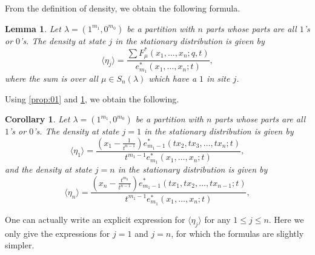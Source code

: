 \documentclass[12pt]{amsart}
\newtheorem{cor}[thm]{Corollary}
\newtheorem{lem}[thm]{Lemma}
\theoremstyle{definition}
\def\LW#1{(\textcolor{teal}{LW:#1})}
\def\HBD#1{(\textcolor{violet}{HBD:#1})}
\begin{document}
From the definition of density, we obtain the following formula. 
\begin{lem}\label{lem:density}
Let $\lambda = (1^{m_1}, 0^{m_0})$ be a partition with $n$ parts whose parts are all $1$'s or $0$'s.
  The density at state $j$ in the stationary distribution is given by 
  $$\langle \eta_j \rangle =
  \frac{\sum F^*_{\mu}(x_1,\dots,x_n; q,t)}{e^*_{m_1}(x_1,\dots,x_n;t)},$$
  where the sum is over all $\mu\in S_n(\lambda)$ which have a $1$ in site $j$.
\end{lem}
Using \cref{prop:01} and \cref{lem:density}, we obtain the following.
\begin{cor}\label{cor:density}
    Let $\lambda = (1^{m_1}, 0^{m_0})$ be a partition with $n$ parts whose parts are all $1$'s or $0$'s.
  The density at state $j=1$ in the stationary distribution is given by 
  \begin{equation}\label{eq:density}
  \langle \eta_1 \rangle =
  \frac{(x_1-\frac{1}{t^{n-1}}) e^*_{m_1-1}(tx_2, tx_3,\dots,tx_n;t)} {t^{m_1-1} e^*_{m_1}(x_1,\dots,x_n;t)},
  \end{equation}
   and the density at state $j=n$ in the stationary distribution is given by 
  $$\langle \eta_n \rangle =
  \frac{(x_n-\frac{t^{m_0}}{t^{n-1}}) e^*_{m_1-1}(tx_1, tx_2, \dots,tx_{n-1};t)} {t^{m_1-1} e^*_{m_1}(x_1,\dots,x_n;t)},$$
\end{cor}
One can actually write an explicit expression for $\langle\eta_j\rangle$ for any $1\leq j\leq n$. Here we only give the expressions for $j=1$ and $j=n$, for which the formulas are slightly simpler.
\end{document}
